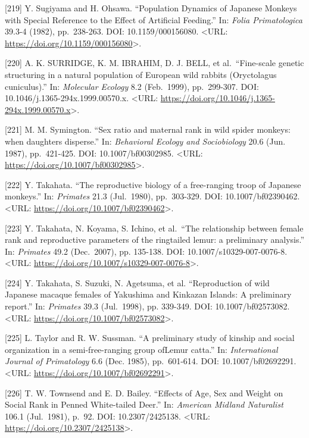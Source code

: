 \documentclass[
]{article}
\begin{document}
{[}219{]} Y. Sugiyama and H. Ohsawa. ``Population Dynamics of Japanese
Monkeys with Special Reference to the Effect of Artificial Feeding.''
In: \emph{Folia Primatologica} 39.3-4 (1982), pp.~238-263. DOI:
10.1159/000156080. \textless URL:
\url{https://doi.org/10.1159/000156080}\textgreater.

{[}220{]} A. K. SURRIDGE, K. M. IBRAHIM, D. J. BELL, et al.~``Fine-scale
genetic structuring in a natural population of European wild rabbits
(Oryctolagus cuniculus).'' In: \emph{Molecular Ecology} 8.2 (Feb.~1999),
pp.~299-307. DOI: 10.1046/j.1365-294x.1999.00570.x. \textless URL:
\url{https://doi.org/10.1046/j.1365-294x.1999.00570.x}\textgreater.

{[}221{]} M. M. Symington. ``Sex ratio and maternal rank in wild spider
monkeys: when daughters disperse.'' In: \emph{Behavioral Ecology and
Sociobiology} 20.6 (Jun. 1987), pp.~421-425. DOI: 10.1007/bf00302985.
\textless URL: \url{https://doi.org/10.1007/bf00302985}\textgreater.

{[}222{]} Y. Takahata. ``The reproductive biology of a free-ranging
troop of Japanese monkeys.'' In: \emph{Primates} 21.3 (Jul.~1980),
pp.~303-329. DOI: 10.1007/bf02390462. \textless URL:
\url{https://doi.org/10.1007/bf02390462}\textgreater.

{[}223{]} Y. Takahata, N. Koyama, S. Ichino, et al.~``The relationship
between female rank and reproductive parameters of the ringtailed lemur:
a preliminary analysis.'' In: \emph{Primates} 49.2 (Dec.~2007), pp.
135-138. DOI: 10.1007/s10329-007-0076-8. \textless URL:
\url{https://doi.org/10.1007/s10329-007-0076-8}\textgreater.

{[}224{]} Y. Takahata, S. Suzuki, N. Agetsuma, et al. ``Reproduction of
wild Japanese macaque females of Yakushima and Kinkazan Islands: A
preliminary report.'' In: \emph{Primates} 39.3 (Jul.~1998), pp. 339-349.
DOI: 10.1007/bf02573082. \textless URL:
\url{https://doi.org/10.1007/bf02573082}\textgreater.

{[}225{]} L. Taylor and R. W. Sussman. ``A preliminary study of kinship
and social organization in a semi-free-ranging group ofLemur catta.''
In: \emph{International Journal of Primatology} 6.6 (Dec. 1985),
pp.~601-614. DOI: 10.1007/bf02692291. \textless URL:
\url{https://doi.org/10.1007/bf02692291}\textgreater.

{[}226{]} T. W. Townsend and E. D. Bailey. ``Effects of Age, Sex and
Weight on Social Rank in Penned White-tailed Deer.'' In: \emph{American
Midland Naturalist} 106.1 (Jul.~1981), p.~92. DOI: 10.2307/2425138.
\textless URL: \url{https://doi.org/10.2307/2425138}\textgreater.
\end{document}
